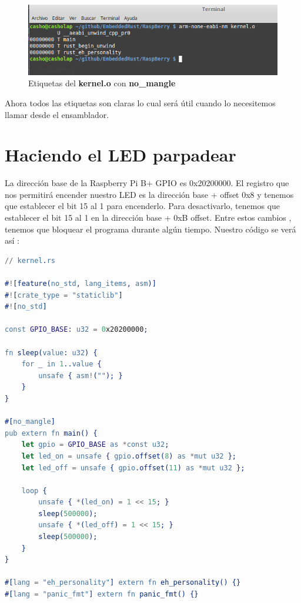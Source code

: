 \documentclass[12pt, twoside]{report}
\begin{document}
\begin{figure}
	\centering	\includegraphics[width=1\linewidth]{rust_kernel4.png}
	\caption{Etiquetas del \textbf{kernel.o} con \textbf{no\_mangle}}
	\label{fig0004}
\end{figure}

Ahora todos las etiquetas son claras lo cual será útil cuando lo necesitemos llamar desde el ensamblador.

\section{Haciendo el LED parpadear}

La dirección base de la Raspberry Pi B+ GPIO es 0x20200000. El registro que nos permitirá encender nuestro LED es la dirección base + offset 0x8 y tenemos que establecer el bit 15 al 1 para encenderlo. Para desactivarlo, tenemos que establecer el bit 15 al 1 en la dirección base + 0xB offset. Entre estos cambios , tenemos que bloquear el programa durante algún tiempo. Nuestro código se verá así :

\begin{lstlisting}[language=erlang]
// kernel.rs

#![feature(no_std, lang_items, asm)]
#![crate_type = "staticlib"]
#![no_std]

const GPIO_BASE: u32 = 0x20200000;

fn sleep(value: u32) {  
    for _ in 1..value {
        unsafe { asm!(""); }
    }
}

#[no_mangle]
pub extern fn main() {  
    let gpio = GPIO_BASE as *const u32;
    let led_on = unsafe { gpio.offset(8) as *mut u32 };
    let led_off = unsafe { gpio.offset(11) as *mut u32 };

    loop {
        unsafe { *(led_on) = 1 << 15; }
        sleep(500000);
        unsafe { *(led_off) = 1 << 15; }
        sleep(500000);
    }
}

#[lang = "eh_personality"] extern fn eh_personality() {}
#[lang = "panic_fmt"] extern fn panic_fmt() {}
\end{lstlisting}
\end{document}
